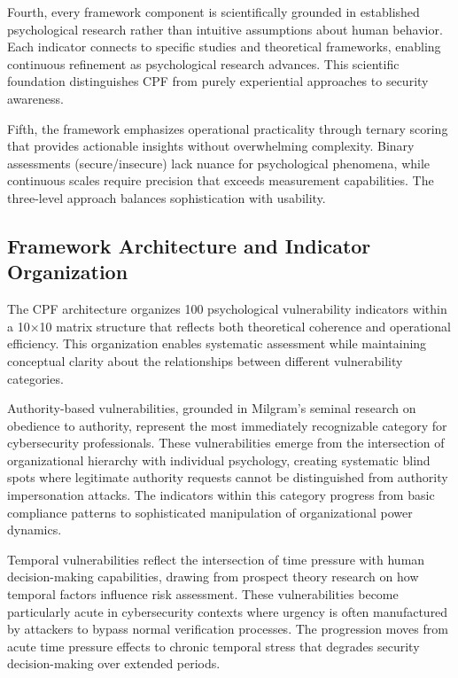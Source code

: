 \documentclass[11pt,a4paper]{article}
\begin{document}
Fourth, every framework component is scientifically grounded in established psychological research rather than intuitive assumptions about human behavior. Each indicator connects to specific studies and theoretical frameworks, enabling continuous refinement as psychological research advances. This scientific foundation distinguishes CPF from purely experiential approaches to security awareness.

Fifth, the framework emphasizes operational practicality through ternary scoring that provides actionable insights without overwhelming complexity. Binary assessments (secure/insecure) lack nuance for psychological phenomena, while continuous scales require precision that exceeds measurement capabilities. The three-level approach balances sophistication with usability.

\subsection{Framework Architecture and Indicator Organization}

The CPF architecture organizes 100 psychological vulnerability indicators within a 10×10 matrix structure that reflects both theoretical coherence and operational efficiency. This organization enables systematic assessment while maintaining conceptual clarity about the relationships between different vulnerability categories.

Authority-based vulnerabilities, grounded in Milgram's seminal research on obedience to authority\cite{milgram1974}, represent the most immediately recognizable category for cybersecurity professionals. These vulnerabilities emerge from the intersection of organizational hierarchy with individual psychology, creating systematic blind spots where legitimate authority requests cannot be distinguished from authority impersonation attacks. The indicators within this category progress from basic compliance patterns to sophisticated manipulation of organizational power dynamics.

Temporal vulnerabilities reflect the intersection of time pressure with human decision-making capabilities, drawing from prospect theory research on how temporal factors influence risk assessment\cite{kahneman1979}. These vulnerabilities become particularly acute in cybersecurity contexts where urgency is often manufactured by attackers to bypass normal verification processes. The progression moves from acute time pressure effects to chronic temporal stress that degrades security decision-making over extended periods.
\end{document}
